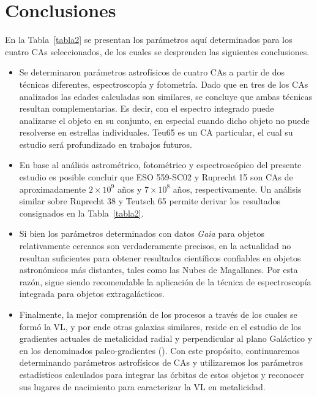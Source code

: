 \documentclass[baaa]{baaa}
\begin{document}
\section{Conclusiones}\label{s_6}
En la Tabla~\ref{tabla2} se presentan los par\'ametros aqu\'i determinados para los cuatro CAs seleccionados, de los cuales se desprenden las siguientes conclusiones.
\begin{itemize}
    \item Se determinaron par\'ametros astrof\'isicos de cuatro CAs a partir de dos t\'ecnicas diferentes, espectroscop\'ia y fotometr\'ia. Dado que en tres de los CAs analizados las edades calculadas son similares, se concluye que ambas t\'ecnicas resultan complementarias. Es decir, con el espectro integrado puede analizarse el objeto en su conjunto, en especial cuando dicho objeto no puede resolverse en estrellas individuales. Teu65 es un CA particular, el cual su estudio será profundizado en trabajos futuros.
    \item En base al an\'alisis astrom\'etrico, fotom\'etrico y espectrosc\'opico del presente estudio es posible concluir que ESO 559-SC02 y Ruprecht 15 son CAs de aproximadamente $2 \times 10^9$ a\~nos y $7 \times 10^8$ a\~nos, respectivamente. Un an\'alisis similar sobre Ruprecht 38 y Teutsch 65 permite derivar los resultados consignados en la Tabla~\ref{tabla2}.
    \item Si bien los par\'ametros determinados con datos {\sl Gaia} para objetos relativamente cercanos son verdaderamente precisos, en la actualidad no resultan suficientes para obtener resultados cient\'ificos confiables en objetos astron\'omicos m\'as distantes, tales como las Nubes de Magallanes. Por esta raz\'on, sigue siendo recomendable la aplicaci\'on de la t\'ecnica de espectroscop\'ia integrada para objetos extragal\'acticos.
    \item Finalmente, la mejor comprensi\'on de los procesos a trav\'es de los cuales se form\'o la VL, y por ende otras galaxias similares, reside en el estudio de los gradientes actuales de metalicidad radial y perpendicular al plano Gal\'actico y en los denominados paleo-gradientes (\citealt{P95}). Con este prop\'osito, continuaremos determinando par\'ametros astrof\'isicos de CAs y utilizaremos los par\'ametros estad\'isticos calculados para integrar las \'orbitas de estos objetos y reconocer sus lugares de nacimiento para caracterizar la VL en metalicidad.
\end{itemize}

\end{document}
